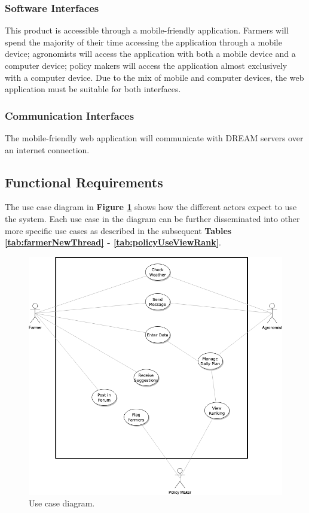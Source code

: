 \subsubsection{Software Interfaces}
This product is accessible through a mobile-friendly application. Farmers will spend the majority of their time accessing the application through a mobile device; agronomists will access the application with both a mobile device and a computer device; policy makers will access the application almost exclusively with a computer device. Due to the mix of mobile and computer devices, the web application must be suitable for both interfaces.


\subsubsection{Communication Interfaces}
The mobile-friendly web application will communicate with DREAM servers over an internet connection.

\newpage
\subsection{Functional Requirements}

\setcounter{usecase_counter}{1}

The use case diagram in \textbf{Figure \ref{fig:usecase}} shows how the different actors expect to use the system. Each use case in the diagram can be further disseminated into other more specific use cases as described in the subsequent \textbf{Tables \ref{tab:farmerNewThread} - \ref{tab:policyUseViewRank}}.
\begin{figure}[htb!]\begin{flushleft}

\end{flushleft}
\centering
\includegraphics[scale=0.6]{../images_diagrams/usecasediagram.png}
\caption{\label{fig:usecase}Use case diagram.}
\end{figure}

